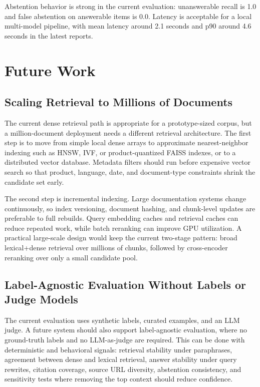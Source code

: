 \documentclass[11pt]{article}
\begin{document}
Abstention behavior is strong in the current evaluation: unanswerable recall is 1.0 and
false abstention on answerable items is 0.0. Latency is acceptable for a local multi-model
pipeline, with mean latency around 2.1 seconds and p90 around 4.6 seconds in the latest
reports.

\section{Future Work}

\subsection{Scaling Retrieval to Millions of Documents}

The current dense retrieval path is appropriate for a prototype-sized corpus, but a
million-document deployment needs a different retrieval architecture. The first step is to
move from simple local dense arrays to approximate nearest-neighbor indexing such as HNSW,
IVF, or product-quantized FAISS indexes, or to a distributed vector database. Metadata
filters should run before expensive vector search so that product, language, date, and
document-type constraints shrink the candidate set early.

The second step is incremental indexing. Large documentation systems change continuously,
so index versioning, document hashing, and chunk-level updates are preferable to full
rebuilds. Query embedding caches and retrieval caches can reduce repeated work, while
batch reranking can improve GPU utilization. A practical large-scale design would keep the
current two-stage pattern: broad lexical+dense retrieval over millions of chunks, followed
by cross-encoder reranking over only a small candidate pool.

\subsection{Label-Agnostic Evaluation Without Labels or Judge Models}

The current evaluation uses synthetic labels, curated examples, and an LLM judge. A future
system should also support label-agnostic evaluation, where no ground-truth labels and no
LLM-as-judge are required. This can be done with deterministic and behavioral signals:
retrieval stability under paraphrases, agreement between dense and lexical retrieval,
answer stability under query rewrites, citation coverage, source URL diversity, abstention
consistency, and sensitivity tests where removing the top context should reduce confidence.
\end{document}
